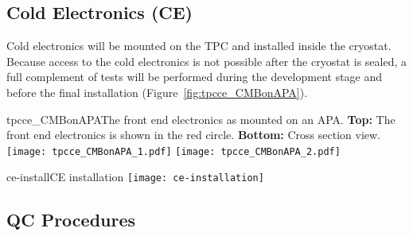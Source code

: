 \subsection{Cold Electronics (CE)}
\label{subsec:ce_install}

Cold electronics will be mounted on the TPC and installed inside the cryostat.
Because access to the cold electronics is not possible after the cryostat is sealed,
a full complement of tests will be performed during the development stage and before the final installation
(Figure~\ref{fig:tpcce_CMBonAPA}).

\begin{cdrfigure}{tpcce_CMBonAPA}{The front end electronics as mounted on an APA.
  {\bf Top:} The front end electronics  is shown in the red circle.
  {\bf Bottom:} Cross section view.}
\texttt{[image: tpcce\_CMBonAPA\_1.pdf]}
\texttt{[image: tpcce\_CMBonAPA\_2.pdf]}
\end{cdrfigure}



\begin{cdrfigure}[CE installation]{ce-install}{CE installation}
\texttt{[image: ce-installation]}
\end{cdrfigure}


\subsection{QC Procedures}

